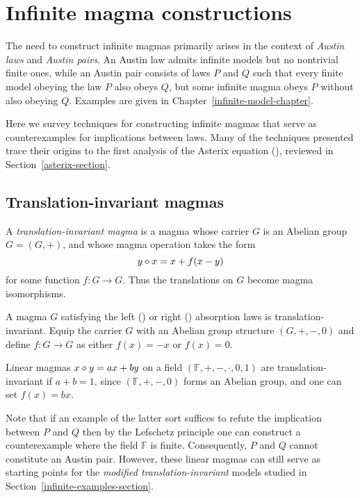 \chapter{Infinite magma constructions}\label{infinite-magma-constructions-chapter}

The need to construct infinite magmas primarily arises in the context of \emph{Austin laws} and \emph{Austin pairs}.
An Austin law admits infinite models but no nontrivial finite ones, while an Austin pair consists of
laws $P$ and $Q$ such that every finite model obeying the law $P$ also obeys $Q$, but some
infinite magma obeys $P$ without also obeying $Q$. Examples are given in Chapter~\ref{infinite-model-chapter}.

Here we survey techniques for constructing infinite magmas that serve as counterexamples for implications
between laws. Many of the techniques presented trace their origins to the first analysis of the Asterix equation
(), reviewed in Section~\ref{asterix-section}.

\section{Translation-invariant magmas}

A \emph{translation-invariant magma} is a magma whose carrier $G$ is an Abelian group $G = (G,+)$, and whose magma operation takes the form
$$ y \diamond x = x + f(x-y)$$
for some function $f: G \to G$.  Thus the translations on $G$ become magma isomorphisms.

\begin{example}
  A magma $G$ satisfying the left () or right () absorption laws is translation-invariant.
  Equip the carrier $G$ with an Abelian group structure $(G,+,-,0)$ and define $f: G \to G$ as either $f(x) = -x$ or $f(x) = 0$.
\end{example}

\begin{example}
  Linear magmas $x\diamond y = ax+by$ on a field $(\mathbb{F},+,-,\cdot,0,1)$ are translation-invariant if $a + b = 1$,
  since $(\mathbb{F},+,-,0)$ forms an Abelian group, and one can set $f(x) = bx$.
\end{example}

Note that if an example of the latter sort suffices to refute the implication between $P$ and $Q$ then
by the Lefschetz principle one can construct a counterexample where the field $\mathbb{F}$ is finite.
Consequently, $P$ and $Q$ cannot constitute an Austin pair. However, these linear magmas can still serve
as starting points for the \emph{modified translation-invariant} models studied in Section~\ref{infinite-examples-section}.

